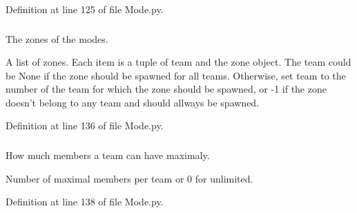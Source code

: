 Definition at line 125 of file Mode.py.

\hypertarget{class_mode_1_1_mode_a0672655c12a3e18e65d084c395d9378c}{
\subsubsection[{\_\-\_\-zones}]{}}
\label{class_mode_1_1_mode_a0672655c12a3e18e65d084c395d9378c}


The zones of the modes. 

A list of zones. Each item is a tuple of team and the zone object. The team could be None if the zone should be spawned for all teams. Otherwise, set team to the number of the team for which the zone should be spawned, or -\/1 if the zone doesn't belong to any team and should allways be spawned. 

Definition at line 136 of file Mode.py.

\hypertarget{class_mode_1_1_mode_ad4ba6cae17b92d4c8c85c35dc9418c8b}{
\subsubsection[{max\_\-team\_\-members}]{}}
\label{class_mode_1_1_mode_ad4ba6cae17b92d4c8c85c35dc9418c8b}


How much members a team can have maximaly. 

Number of maximal members per team or 0 for unlimited. 

Definition at line 138 of file Mode.py.

\hypertarget{class_mode_1_1_mode_a55c4e205a8cb20550c0f3924471522ab}{
\subsubsection[{max\_\-teams}]{}}
\label{class_mode_1_1_mode_a55c4e205a8cb20550c0f3924471522ab}


